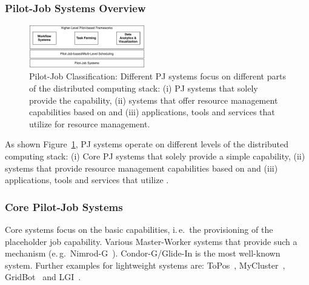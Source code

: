 \documentclass{sig-alternate}
\begin{document}
\subsubsection{Pilot-Job Systems Overview}

\begin{figure}[t]
	\centering
		\includegraphics[width=0.45\textwidth]{figures/classification}
	\caption{Pilot-Job Classification: Different PJ systems focus
          on different parts of the distributed computing stack: (i)
          PJ systems that solely provide the \pilot capability, (ii)
          systems that offer resource management capabilities based on
          \pilots and (iii) applications, tools and services that
          utilize \pilots for resource management. }
	\label{fig:figures_classification}
\end{figure}


As shown Figure~\ref{fig:figures_classification}, PJ systems operate
on different levels of the distributed computing stack: (i) Core PJ
systems that solely provide a simple \pilot capability, (ii) systems
that provide resource management capabilities based on \pilots and
(iii) applications, tools and services that utilize
\pilots. 

\subsubsection*{Core Pilot-Job Systems}

Core \pilotjob systems focus on the basic \pilot capabilities, i.\,e.\ the
provisioning of the placeholder job capability. Various Master-Worker systems
that provide such a mechanism (e.\,g.\
Nimrod-G~\cite{10.1109/HPC.2000.846563}). Condor-G/Glide-In is the most
well-known \pilotjob system. Further examples for lightweight \pilotjob
systems are: ToPos~\cite{topos},
MyCluster~\cite{Walker:2007:PAC:1285840.1285848},
GridBot~\cite{Silberstein:2009:GEB:1654059.1654071} and LGI~\cite{lgi}.
\end{document}
